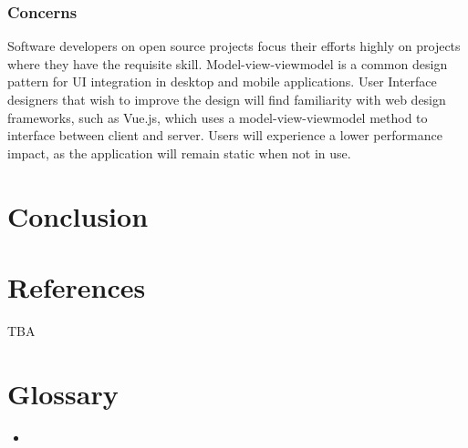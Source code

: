 \documentclass[onecolumn, draftclsnofoot,10pt, compsoc]{IEEEtran}
\begin{document}
\subsubsection{Concerns}
Software developers on open source projects focus their efforts highly on projects where they have the requisite skill.
Model-view-viewmodel is a common design pattern for UI integration in desktop and mobile applications. 
User Interface designers that wish to improve the design will find familiarity with web design frameworks, such as Vue.js, which uses a model-view-viewmodel method to interface between client and server.
Users will experience a lower performance impact, as the application will remain static when not in use.

\section{Conclusion}

\section{References}
TBA

\section{Glossary}
\begin{itemize}
    \item 
\end{itemize}
\end{document}
